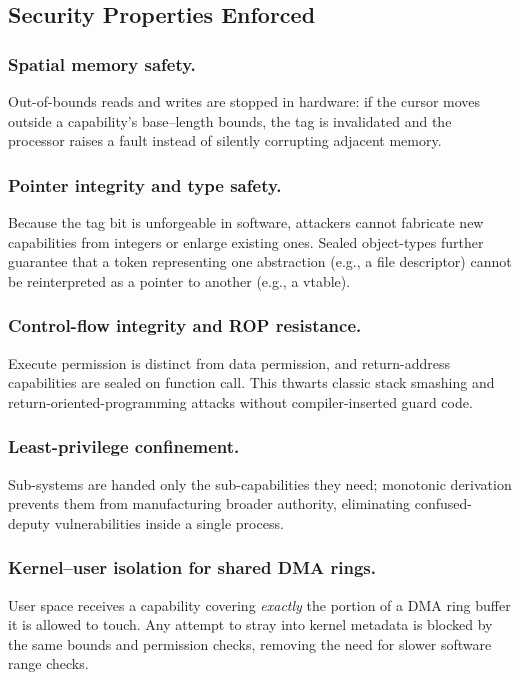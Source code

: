 \documentclass[sigconf]{acmart}
\begin{document}
\subsection{Security Properties Enforced}


\subsubsection{Spatial memory safety.}
Out-of-bounds reads and writes are stopped in hardware: if the cursor moves outside a capability’s base–length bounds, the tag is invalidated and the processor raises a fault instead of silently corrupting adjacent memory.

\subsubsection{Pointer integrity and type safety.}
Because the tag bit is unforgeable in software, attackers cannot fabricate new capabilities from integers or enlarge existing ones.  Sealed object-types further guarantee that a token representing one abstraction (e.g., a file descriptor) cannot be reinterpreted as a pointer to another (e.g., a vtable).

\subsubsection{Control-flow integrity and ROP resistance.}
Execute permission is distinct from data permission, and return-address capabilities are sealed on function call.  This thwarts classic stack smashing and return-oriented-programming attacks without compiler-inserted guard code.

\subsubsection{Least-privilege confinement.}
Sub-systems are handed only the sub-capabilities they need; monotonic derivation prevents them from manufacturing broader authority, eliminating confused-deputy vulnerabilities inside a single process.

\subsubsection{Kernel–user isolation for shared DMA rings.}
User space receives a capability covering \emph{exactly} the portion of a DMA ring buffer it is allowed to touch.  Any attempt to stray into kernel metadata is blocked by the same bounds and permission checks, removing the need for slower software range checks.
\end{document}
